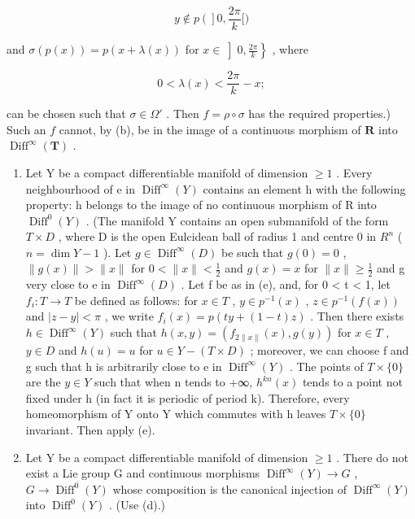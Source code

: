 \[
y \notin p \left(\right] 0, \frac {2 \pi}{k} [)
\]

and \(\sigma(p(x)) = p(x + \lambda(x))\) for \(x \in \left]0, \frac{2\pi}{k}\right\}\) , where

\[
0 <   \lambda (x) <   \frac {2 \pi}{k} - x;
\]

can be chosen such that \(\sigma \in \Omega'\) . Then \(f = \rho \circ \sigma\) has the required properties.) Such an \(f\) cannot, by (b), be in the image of a continuous morphism of \(\mathbf{R}\) into \(\operatorname{Diff}^{\infty}(\mathbf{T})\) .

\begin{enumerate}
\def\labelenumi{(\alph{enumi})}
\setcounter{enumi}{3}
\item
  Let Y be a compact differentiable manifold of dimension \(\geqslant1\) . Every neighbourhood of e in \(\operatorname{Diff}^{\infty}(Y)\) contains an element h with the following property: h belongs to the image of no continuous morphism of R into \(\operatorname{Diff}^{0}(Y)\) . (The manifold Y contains an open submanifold of the form \(T \times D\) , where D is the open Eulcidean ball of radius 1 and centre 0 in \(R^{n}\) ( \(n = \dim Y - 1\) ). Let \(g \in \operatorname{Diff}^{\infty}(D)\) be such that \(g(0) = 0\) , \(\|g(x)\| > \|x\|\) for \(0 < \|x\| < \frac{1}{2}\) and \(g(x) = x\) for \(\|x\| \geqslant \frac{1}{2}\) and g very close to e in \(\operatorname{Diff}^{\infty}(D)\) . Let f be as in (e), and, for 0 \textless{} t \textless{} 1, let \(f_{i}: T \to T\) be defined as follows: for \(x \in T\) , \(y \in p^{-1}(x)\) , \(z \in p^{-1}(f(x))\) and \(|z - y| < \pi\) , we write \(f_{i}(x) = p(ty + (1 - t)z)\) . Then there exists \(h \in \operatorname{Diff}^{\infty}(Y)\) such that \(h(x, y) = (f_{2\|x\|}(x), g(y))\) for \(x \in T\) , \(y \in D\) and \(h(u) = u\) for \(u \in Y - (T \times D)\) ; moreover, we can choose f and g such that h is arbitrarily close to e in \(\operatorname{Diff}^{\infty}(Y)\) . The points of \(T \times \{0\}\) are the \(y \in Y\) such that when n tends to +∞, \(h^{kn}(x)\) tends to a point not fixed under h (in fact it is periodic of period k). Therefore, every homeomorphism of Y onto Y which commutes with h leaves \(T \times \{0\}\) invariant. Then apply (e).
\item
  Let Y be a compact differentiable manifold of dimension \(\geqslant1\) . There do not exist a Lie group G and continuous morphisms \(\operatorname{Diff}^{\infty}(Y)\to G\) , \(G\to\operatorname{Diff}^{0}(Y)\) whose composition is the canonical injection of \(\operatorname{Diff}^{\infty}(Y)\) into \(\operatorname{Diff}^{0}(Y)\) . (Use (d).)
\end{enumerate}

